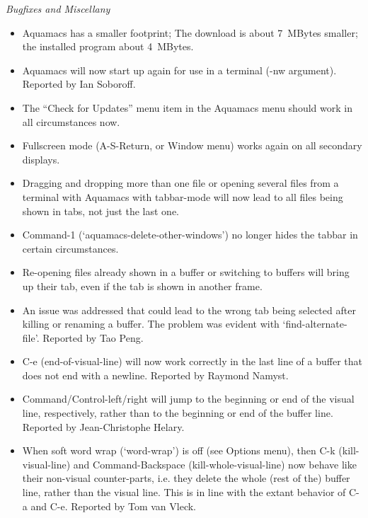 \emph{Bugfixes and Miscellany}

\begin{itemize}

\item Aquamacs has a smaller footprint; The download is about 7~MBytes smaller; the installed program about 4~MBytes.

\item Aquamacs will now start up again for use in a terminal (-nw argument).
Reported by Ian Soboroff.

\item The ``Check for Updates'' menu item in the Aquamacs menu should work in all circumstances now.

\item Fullscreen mode (A-S-Return, or Window menu) works again on all secondary displays.

\item Dragging and dropping more than one file or opening several files from a terminal with Aquamacs with tabbar-mode will now lead to all files being shown in tabs, not just the last one.

\item Command-1 (`aquamacs-delete-other-windows') no longer hides the tabbar in certain circumstances.

\item Re-opening files already shown in a buffer or switching to buffers will bring up their tab, even if the tab is shown in another frame.

\item An issue was addressed that could lead to the wrong tab being selected after killing or renaming a buffer.  The problem was evident with `find-alternate-file'.
Reported by Tao Peng.

\item C-e (end-of-visual-line) will now work correctly in the last line of a buffer that does not end with a newline.
  Reported by Raymond Namyst.

\item Command/Control-left/right will jump to the beginning or end of the visual line, respectively, rather than to the beginning or end of the buffer line.
Reported by Jean-Christophe Helary.

\item When soft word wrap (`word-wrap') is off (see Options menu), then C-k (kill-visual-line) and Command-Backspace (kill-whole-visual-line) now behave like their non-visual counter-parts, i.e. they delete the whole (rest of the) buffer line, rather than the visual line.  This is in line with the extant behavior of C-a and C-e.
Reported by Tom van Vleck.


\end{itemize}

